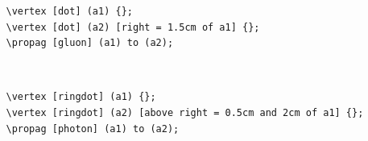\documentclass[10pt,letterpaper,twoside,notitlepage]{article}
\numberwithin{figure}{section}
\begin{document}
\noindent
\begin{minipage}{0.75\linewidth}
\blucol\begin{verbatim}
   \vertex [dot] (a1) {};
   \vertex [dot] (a2) [right = 1.5cm of a1] {};
   \propag [gluon] (a1) to (a2);
\end{verbatim}\txcol
\end{minipage}
%
\begin{minipage}{0.2\linewidth}
\end{minipage}
\\
\begin{minipage}{0.75\linewidth}
\blucol\begin{verbatim}
   \vertex [ringdot] (a1) {};
   \vertex [ringdot] (a2) [above right = 0.5cm and 2cm of a1] {};
   \propag [photon] (a1) to (a2);
\end{verbatim}\txcol
\end{minipage}
%
\begin{minipage}{0.2\linewidth}
\end{minipage}



%
%
\end{document}
